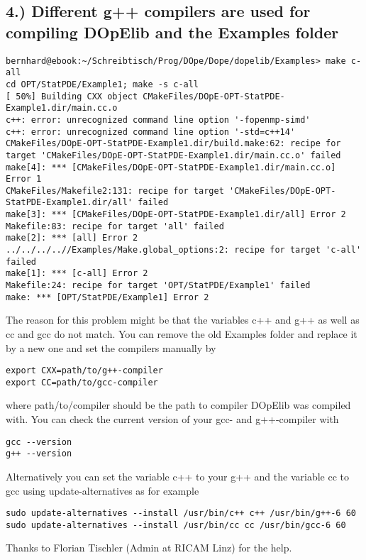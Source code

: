 \subsection*{4.) Different g++ compilers are used for compiling DOpElib and the Examples folder}
\begin{lstlisting}
bernhard@ebook:~/Schreibtisch/Prog/DOpe/Dope/dopelib/Examples> make c-all
cd OPT/StatPDE/Example1; make -s c-all
[ 50%] Building CXX object CMakeFiles/DOpE-OPT-StatPDE-Example1.dir/main.cc.o
c++: error: unrecognized command line option '-fopenmp-simd'
c++: error: unrecognized command line option '-std=c++14'
CMakeFiles/DOpE-OPT-StatPDE-Example1.dir/build.make:62: recipe for target 'CMakeFiles/DOpE-OPT-StatPDE-Example1.dir/main.cc.o' failed
make[4]: *** [CMakeFiles/DOpE-OPT-StatPDE-Example1.dir/main.cc.o] Error 1
CMakeFiles/Makefile2:131: recipe for target 'CMakeFiles/DOpE-OPT-StatPDE-Example1.dir/all' failed
make[3]: *** [CMakeFiles/DOpE-OPT-StatPDE-Example1.dir/all] Error 2
Makefile:83: recipe for target 'all' failed
make[2]: *** [all] Error 2
../../../..//Examples/Make.global_options:2: recipe for target 'c-all' failed
make[1]: *** [c-all] Error 2
Makefile:24: recipe for target 'OPT/StatPDE/Example1' failed
make: *** [OPT/StatPDE/Example1] Error 2
\end{lstlisting}

The reason for this problem might be that the variables c++ and g++ as well as cc and gcc do not match.
\newline
You can remove the old Examples folder and replace it by a new one and set the compilers manually by
\begin{lstlisting}
export CXX=path/to/g++-compiler
export CC=path/to/gcc-compiler
\end{lstlisting}
where path/to/compiler should be the path to compiler DOpElib was compiled with.
You can check the current version of your gcc- and g++-compiler with 
\begin{lstlisting}
gcc --version
g++ --version
\end{lstlisting}
Alternatively you can set the variable c++ to your g++ and the variable cc to gcc using update-alternatives
as for example
\begin{lstlisting}
sudo update-alternatives --install /usr/bin/c++ c++ /usr/bin/g++-6 60
sudo update-alternatives --install /usr/bin/cc cc /usr/bin/gcc-6 60
\end{lstlisting}
Thanks to Florian Tischler (Admin at RICAM Linz) for the help.



